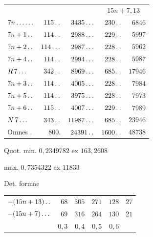 \begin{center}\begin{tabular}{@{}lrrrr@{}}
& & & \multicolumn{2}{c}{$15n+7{,}13$}\\
$7n\mathinner{.\,.\,.\,.\,.\,.}$ & $115\mathinner{.\,.}$ & $3435\mathinner{.\,.\,.}$ & $230\mathinner{.\,.}$ & $6846$\\
$7n+1\mathinner{.\,.}$ & $114\mathinner{.\,.}$ & $2988\mathinner{.\,.\,.}$ & $229\mathinner{.\,.}$ & $5997$\\
$7n+2\mathinner{.\,.}$ & $114\mathinner{.\,.\,.}$ & $2987\mathinner{.\,.\,.}$ & $228\mathinner{.\,.}$ & $5962$\\
$7n+4\mathinner{.\,.}$ & $114\mathinner{.\,.}$ & $2994\mathinner{.\,.\,.}$ & $228\mathinner{.\,.}$ & $5987$\\
$R\,7\mathinner{.\,.\,.}$ & $342\mathinner{.\,.}$ & $8969\mathinner{.\,.\,.}$ & $685\mathinner{.\,.}$ & $17946$\\
$7n+3\mathinner{.\,.}$ & $114\mathinner{.\,.}$ & $4005\mathinner{.\,.\,.}$ & $228\mathinner{.\,.}$ & $7984$\\
$7n+5\mathinner{.\,.}$ & $114\mathinner{.\,.}$ & $3975\mathinner{.\,.\,.}$ & $228\mathinner{.\,.}$ & $7973$\\
$7n+6\mathinner{.\,.}$ & $115\mathinner{.\,.}$ & $4007\mathinner{.\,.\,.}$ & $229\mathinner{.\,.}$ & $7989$\\
$N\,7\mathinner{.\,.\,.}$ & $343\mathinner{.\,.}$ & $11987\mathinner{.\,.\,.}$ & $685\mathinner{.\,.}$ & $23946$\\
Omnes . & $800.$ & $24391\mathinner{.\,.}$ & $1600\mathinner{.\,.}$ & $48738$
\end{tabular}\end{center}
\noindent Quot. min. $0{,}2349782$ ex $163{,}2608$
\par\noindent\quad max. $0{,}7354322$ ex $11833$
\par\noindent Det. formae
\begin{center}\begin{tabular}{@{}lrrrrr@{}}
$-(15n+13)\mathinner{.\,.}$ & $68$ & $305$ & $271$ & $128$ & $27$\\
$-(15n+7)\mathinner{.\,.\,.}$ & $69$ & $316$ & $264$ & $130$ & $21$\\
& $0{,}3$ & $0{,}4$ & $0{,}5$ & $0{,}6$ &
\end{tabular}\end{center}
\par\medskip
{}
